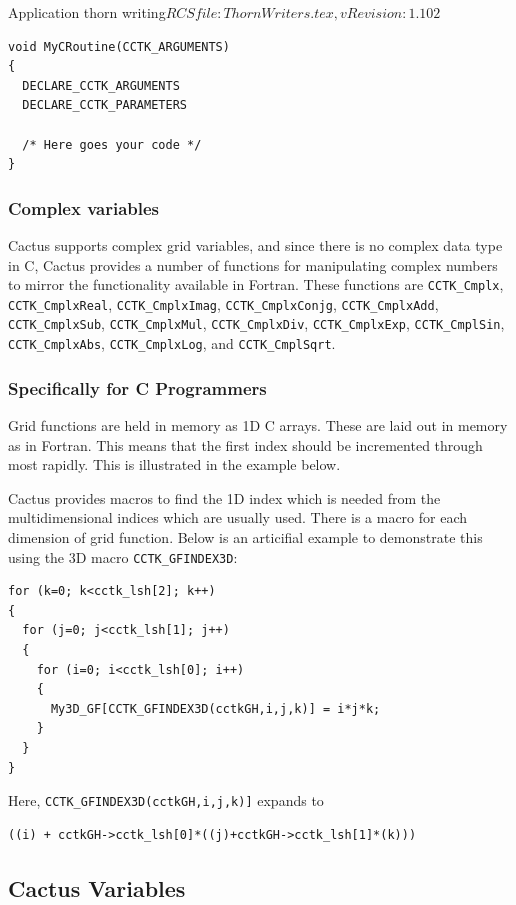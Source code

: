 \begin{cactuspart}{2}{Application thorn writing}{$RCSfile: ThornWriters.tex,v $}{$Revision: 1.102 $}
\begin{verbatim}
void MyCRoutine(CCTK_ARGUMENTS)
{
  DECLARE_CCTK_ARGUMENTS
  DECLARE_CCTK_PARAMETERS

  /* Here goes your code */
}
\end{verbatim}

\subsubsection{Complex variables}

Cactus supports complex grid variables, and since there is no
complex data type in C, Cactus provides a number
of functions for manipulating complex numbers to mirror the
functionality available in Fortran. These functions are {\tt CCTK\_Cmplx},
{\tt CCTK\_CmplxReal}, {\tt CCTK\_CmplxImag}, {\tt CCTK\_CmplxConjg},
{\tt CCTK\_CmplxAdd}, {\tt CCTK\_CmplxSub}, {\tt CCTK\_CmplxMul},
{\tt CCTK\_CmplxDiv}, {\tt CCTK\_CmplxExp}, {\tt CCTK\_CmplSin},
{\tt CCTK\_CmplxAbs}, {\tt CCTK\_CmplxLog}, and {\tt CCTK\_CmplSqrt}.


\subsubsection{Specifically for C Programmers}

Grid functions are held in memory as 1D C arrays. These are laid
out in memory as in Fortran. This means that the first index should
be incremented through most rapidly.  This is illustrated in the example
below.

Cactus provides
macros to find the 1D index which is needed from the multidimensional
indices which are usually used. There is a macro for each dimension of
grid function.  Below is an articifial example to demonstrate this
using the 3D macro {\tt CCTK\_GFINDEX3D}:
\begin{verbatim}
for (k=0; k<cctk_lsh[2]; k++)
{
  for (j=0; j<cctk_lsh[1]; j++)
  {
    for (i=0; i<cctk_lsh[0]; i++)
    {
      My3D_GF[CCTK_GFINDEX3D(cctkGH,i,j,k)] = i*j*k;
    }
  }
}
\end{verbatim}
%
Here, {\tt CCTK\_GFINDEX3D(cctkGH,i,j,k)]} expands to
\begin{verbatim}
((i) + cctkGH->cctk_lsh[0]*((j)+cctkGH->cctk_lsh[1]*(k)))
\end{verbatim}

\subsection{Cactus Variables}
\label{sec:cava2}


\end{cactuspart}
